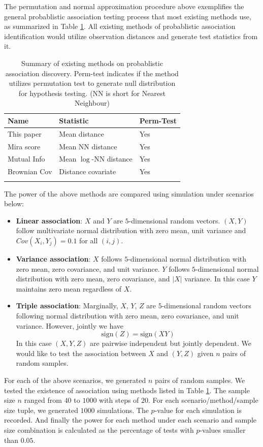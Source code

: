 \documentclass{sig-alternate}
\begin{document}
The permutation and normal approximation procedure above exemplifies
the general probablistic association testing process that most
existing methods use, as summarized in Table \ref{tab:1}. All existing
methods of probablistic association identification would utilize
observation distances and generate test statistics from it. 
\begin{table}
  \centering
  \begin{tabular}{lll}
    \hline{}
    Name & Statistic & Perm-Test \\
    \hline{}
    This paper & Mean distance & Yes \\
    Mira score \cite{my-dissertation} & Mean NN distance &  Yes\\
    Mutual Info \cite{PhysRevE.69.066138, leonenko2008, doi:10.1080/104852504200026815} & Mean $\log$-NN distance & Yes\\
    Brownian Cov  \cite{székely2009, székely2007}  & Distance covariate & Yes\\
    \hline{}
  \end{tabular}
  \caption{Summary of existing methods on probablistic association
    discovery. Perm-test indicates if the method utilizes permutation
    test to generate null distribution for hypothesis testing. (NN 
    is short for Nearest Neighbour)}
  \label{tab:1}
\end{table}
The power of the above methods are compared using simulation under
scenarios below:
\begin{itemize}
\item \textbf{Linear association}: $X$ and $Y$ are $5$-dimensional
  random vectors. $(X,Y)$ follow multivariate normal distribution with
  zero mean, unit variance and $Cov(X_i, Y_j) = 0.1$ for all $(i,j)$.
\item \textbf{Variance association}: $X$ follows $5$-dimensional
  normal distribution with zero mean, zero covariance, and unit
  variance. $Y$ follows $5$-dimensional normal distribution with zero
  mean, zero covariance, and $|X|$ variance. In this case $Y$
  maintains zero mean regardless of $X$.
\item \textbf{Triple association}: Marginally, $X$, $Y$, $Z$ are
  $5$-dimensional random vectors following normal distribution with
  zero mean, zero covariance, and unit variance. However, jointly we
  have
  \begin{displaymath}
    \mathrm{sign}(Z) = \mathrm{sign}(XY)
  \end{displaymath}
  In this case $(X,Y,Z)$ are pairwise independent but jointly
  dependent. We would like to test the association between $X$ and
  $(Y,Z)$ given $n$ pairs of random samples. 
\end{itemize}
For each of the above scenarios, we generated $n$ pairs of random
samples. We tested the existence of association using methods listed
in Table \ref{tab:1}. The sample size $n$ ranged from $40$ to $1000$
with steps of $20$. For each scenario/method/sample size tuple, we
generated $1000$ simulations. The $p$-value for each simulation is
recorded. And finally the power for each method under each scenario
and sample size combination is calculated as the percentage of tests
with $p$-values smaller than $0.05$.
\end{document}
